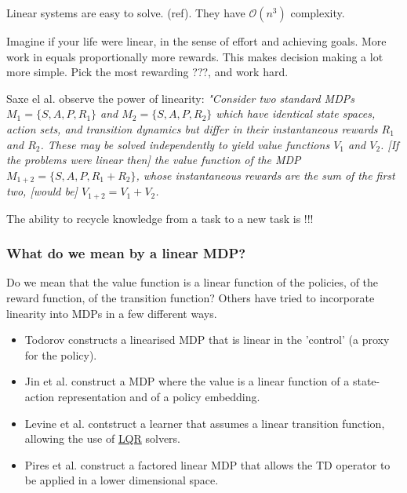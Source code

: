 
Linear systems are easy to solve. (ref). They have $\mathcal O(n^3)$ complexity.

Imagine if your life were linear, in the sense of effort and achieving goals.
More work in equals proportionally more rewards. This makes decision making
a lot more simple. Pick the most rewarding ???, and work hard.

Saxe el al. observe the power of linearity: \textit{"Consider two standard MDPs
$M_1 = \{S, A, P, R_1\}$ and $M_2 = \{S, A, P, R_2\}$ which have
identical state spaces, action sets, and transition dynamics but differ in their
instantaneous rewards $R_1$ and $R_2$. These may be solved independently to
yield value functions $V_1$ and $V_2$. [If the problems were linear then] the value function of the MDP
$M_{1+2} = \{S, A, P, R_1 +R_2\}$, whose instantaneous rewards are the sum of the
first two, [would be] $V_{1+2} = V_1 + V_2$.} \cite{Saxea}

The ability to recycle knowledge from a task to a new task is !!!




\subsubsection{What do we mean by a linear MDP?}

Do we mean that the value function is a linear function of the policies,
of the reward function, of the transition function? Others have tried to incorporate
linearity into MDPs in a few different ways.

\begin{itemize}
  \tightlist
  \item Todorov constructs a linearised MDP that is linear in the 'control' (a proxy for the policy). \cite{Todorov2006}
  \item Jin et al. construct a MDP where the value is a linear function of a state-action representation and of a policy embedding. \cite{Wang}
  \item Levine et al. contstruct a learner that assumes a linear transition function, allowing the use of \href{https://en.wikipedia.org/wiki/Linear%E2%80%93quadratic_regulator}{LQR} solvers.\cite{Levine2019}
  \item Pires et al. construct a factored linear MDP that allows the TD operator to be applied in a lower dimensional space. \cite{Pires2016}
\end{itemize}

